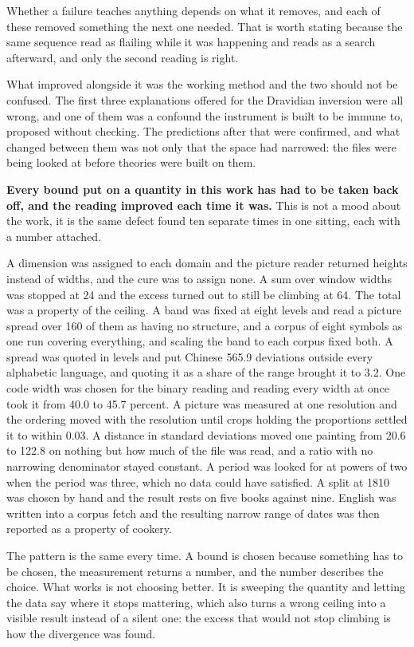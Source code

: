 Whether a failure teaches anything depends on what it removes, and each of these removed something the next one needed. That is worth stating because the same sequence read as flailing while it was happening and reads as a search afterward, and only the second reading is right.

What improved alongside it was the working method and the two should not be confused. The first three explanations offered for the Dravidian inversion were all wrong, and one of them was a confound the instrument is built to be immune to, proposed without checking. The predictions after that were confirmed, and what changed between them was not only that the space had narrowed: the files were being looked at before theories were built on them.

\textbf{Every bound put on a quantity in this work has had to be taken back off, and the reading improved each time it was.} This is not a mood about the work, it is the same defect found ten separate times in one sitting, each with a number attached.

A dimension was assigned to each domain and the picture reader returned heights instead of widths, and the cure was to assign none. A sum over window widths was stopped at 24 and the excess turned out to still be climbing at 64. The total was a property of the ceiling. A band was fixed at eight levels and read a picture spread over 160 of them as having no structure, and a corpus of eight symbols as one run covering everything, and scaling the band to each corpus fixed both. A spread was quoted in levels and put Chinese 565.9 deviations outside every alphabetic language, and quoting it as a share of the range brought it to 3.2. One code width was chosen for the binary reading and reading every width at once took it from 40.0 to 45.7 percent. A picture was measured at one resolution and the ordering moved with the resolution until crops holding the proportions settled it to within 0.03. A distance in standard deviations moved one painting from 20.6 to 122.8 on nothing but how much of the file was read, and a ratio with no narrowing denominator stayed constant. A period was looked for at powers of two when the period was three, which no data could have satisfied. A split at 1810 was chosen by hand and the result rests on five books against nine. English was written into a corpus fetch and the resulting narrow range of dates was then reported as a property of cookery.

The pattern is the same every time. A bound is chosen because something has to be chosen, the measurement returns a number, and the number describes the choice. What works is not choosing better. It is sweeping the quantity and letting the data say where it stops mattering, which also turns a wrong ceiling into a visible result instead of a silent one: the excess that would not stop climbing is how the divergence was found.

